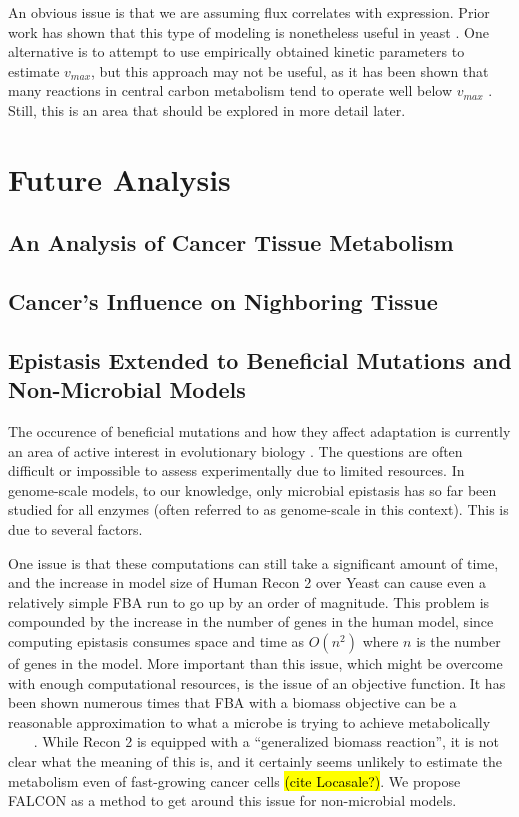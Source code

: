 \documentclass[phd,tocprelim]{cornell}
\theoremstyle{break}
\theoremstyle{empty}
\begin{document}
An obvious issue is that we are assuming flux correlates with
expression. Prior work has shown that this type of modeling is
nonetheless useful in yeast \cite{Lee2012}. One alternative is to
attempt to use empirically obtained kinetic parameters to estimate
$v_{max}$, but this approach may not be useful, as it has been shown
that many reactions in central carbon metabolism tend to operate well
below $v_{max}$ \cite{Bennett2010}. Still, this is an area that should
be explored in more detail later.

\section{Future Analysis}
\subsection{An Analysis of Cancer Tissue Metabolism}
\subsection{Cancer's Influence on Nighboring Tissue}
\subsection{Epistasis Extended to Beneficial Mutations and Non-Microbial Models}

The occurence of beneficial mutations and how they affect adaptation is currently an area of active
interest in evolutionary biology \cite{Chou2011} \cite{Weinreich2006}. The questions are often difficult
or impossible to assess experimentally due to limited resources.  In genome-scale models, to our knowledge,
only microbial epistasis has so far been studied for all enzymes (often referred to as genome-scale 
in this context). This is due to several factors.

One issue is that these computations can still take a significant amount of time, and the increase in model
size of Human Recon 2 over Yeast can cause even a relatively simple FBA run to go up by an order of magnitude.
This problem is compounded by the increase in the number of genes in the human model, since computing epistasis
consumes space and time as $O(n^2)$ where $n$ is the number of genes in the model. More important than this issue,
which might be overcome with enough computational resources, is the issue of an objective function. It has been shown
numerous times that FBA with a biomass objective can be a reasonable approximation to what a microbe is trying to 
achieve metabolically ~\cite{Schuetz2012}~\cite{Fong2004}~\cite{Varma1994} . While Recon 2 is equipped with a ``generalized biomass reaction'', it is not clear
what the meaning of this is, and it certainly seems unlikely to estimate the metabolism even of fast-growing cancer
cells \hl{(cite Locasale?)}. We propose FALCON as a method to get around this issue for non-microbial models.
\end{document}
